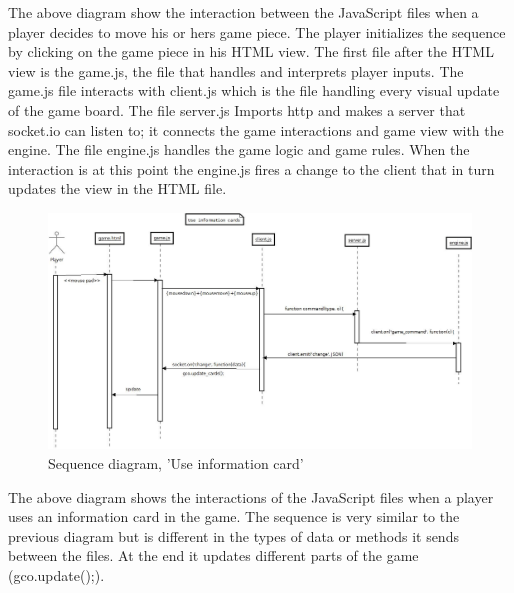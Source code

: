 The above diagram show the interaction between the JavaScript  files when a player decides to move his or hers game piece. The player initializes the sequence by clicking on the game piece in his HTML view. The first file after the HTML view is the game.js, the file that handles and interprets player inputs. The game.js file interacts with client.js which is the file handling every visual update of the game board. The file server.js Imports http and makes a server that socket.io can listen to; it connects the game interactions and game view with the engine. The file engine.js handles the game logic and game rules. When the interaction is at this point the engine.js fires a change to the client that in turn updates the view in the HTML file.\\


\begin{figure}[H]
  \centering
    \includegraphics[width=1.0\textwidth]{img/useinfocardssekvens.jpeg}
  \caption{Sequence diagram, 'Use information card'} 
  \label{fig:useinfoseq}
\end{figure}

The above diagram shows the interactions of the JavaScript files when a player uses an information card in the game. The sequence is very similar to the previous diagram but is different in the types of data or methods it sends between the files. At the end it updates different parts of the game (gco.update();).\\


